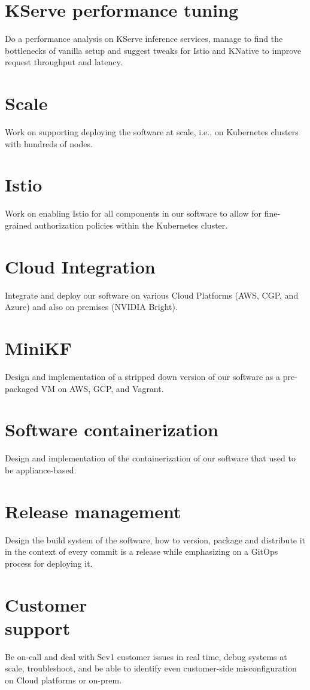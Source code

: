 \documentclass[margin,centered]{res}
\begin{document}
\begin{resume}
\section{\sc KServe performance tuning}
Do a performance analysis on KServe inference services, manage to find the
bottlenecks of vanilla setup and suggest tweaks for Istio and KNative to
improve request throughput and latency.

\section{\sc Scale}
Work on supporting deploying the software at scale, i.e., on Kubernetes
clusters with hundreds of nodes.

\section{\sc Istio}
Work on enabling Istio for all components in our software to allow for
fine-grained authorization policies within the Kubernetes cluster.

\section{\sc Cloud Integration}
Integrate and deploy our software on various Cloud Platforms (AWS, CGP, and
Azure) and also on premises (NVIDIA Bright).

\section{\sc MiniKF}
Design and implementation of a stripped down version of our software as a
pre-packaged VM on AWS, GCP, and Vagrant.

\section{\sc Software containerization}
Design and implementation of the containerization of our software
that used to be appliance-based.

\section{\sc Release management}
Design the build system of the software, how to version, package and distribute
it in the context of every commit is a release while emphasizing on a GitOps
process for deploying it.

\section{\sc Customer\\support}
Be on-call and deal with Sev1 customer issues in real time, debug systems at
scale, troubleshoot, and be able to identify even customer-side
misconfiguration on Cloud platforms or on-prem.


\end{resume}
\end{document}
